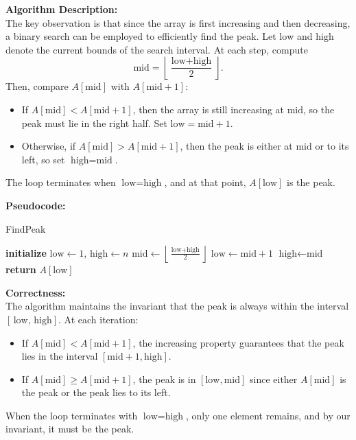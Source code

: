 \documentclass[11pt]{article}
\begin{document}
    \textbf{Algorithm Description:} \\
    The key observation is that since the array is first increasing and then decreasing, a binary search can be employed to efficiently find the peak. Let \( \text{low} \) and \( \text{high} \) denote the current bounds of the search interval. At each step, compute
    \[
    \text{mid} = \left\lfloor \frac{\text{low} + \text{high}}{2} \right\rfloor.
    \]
    Then, compare \( A[\text{mid}] \) with \( A[\text{mid}+1] \):
    \begin{itemize}
        \item If \( A[\text{mid}] < A[\text{mid}+1] \), then the array is still increasing at \( \text{mid} \), so the peak must lie in the right half. Set \( \text{low} = \text{mid} + 1 \).
        \item Otherwise, if \( A[\text{mid}] > A[\text{mid}+1] \), then the peak is either at \( \text{mid} \) or to its left, so set \( \text{high} = \text{mid} \).
    \end{itemize}
    The loop terminates when \( \text{low} = \text{high} \), and at that point, \( A[\text{low}] \) is the peak.
    
    \bigskip
    
    \textbf{Pseudocode:}
    
    \begin{algorithm}[H]
    \caption{FindPeak}
    \begin{algorithmic}[1]
        \State \textbf{initialize} \( \text{low} \gets 1 \), \( \text{high} \gets n \)
            \State \( \text{mid} \gets \left\lfloor \frac{\text{low} + \text{high}}{2} \right\rfloor \)
                \State \( \text{low} \gets \text{mid} + 1 \)
            \Else
                \State \( \text{high} \gets \text{mid} \)
            \EndIf
        \EndWhile
        \State \textbf{return} \( A[\text{low}] \)
    \EndProcedure
    \end{algorithmic}
    \end{algorithm}
    
    \bigskip
    
    \textbf{Correctness:} \\
    The algorithm maintains the invariant that the peak is always within the interval \([\,\text{low},\, \text{high}]\). At each iteration:
    \begin{itemize}
        \item If \( A[\text{mid}] < A[\text{mid}+1] \), the increasing property guarantees that the peak lies in the interval \([\text{mid}+1, \text{high}]\).
        \item If \( A[\text{mid}] \geq A[\text{mid}+1] \), the peak is in \([\text{low}, \text{mid}]\) since either \( A[\text{mid}] \) is the peak or the peak lies to its left.
    \end{itemize}
    When the loop terminates with \( \text{low} = \text{high} \), only one element remains, and by our invariant, it must be the peak.
    
\end{document}
